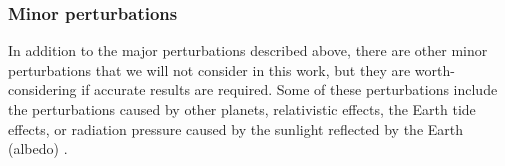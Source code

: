 \documentclass[../main.tex]{subfiles}
\begin{document}
\subsubsection{Minor perturbations}
In addition to the major perturbations described above, there are other minor perturbations that we will not consider in this work, but they are worth-considering if accurate results are required. Some of these perturbations include the perturbations caused by other planets, relativistic effects, the Earth tide effects, or radiation pressure caused by the sunlight reflected by the Earth (albedo) \cite{montenbruck}.
\end{document}
